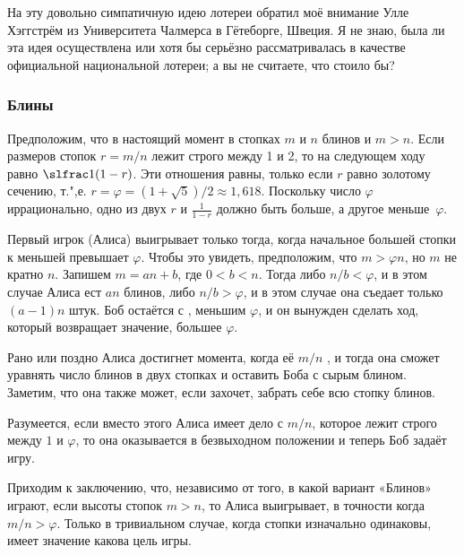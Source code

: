 \documentclass[twoside]{book}
\begin{document}
На эту довольно симпатичную идею лотереи обратил моё внимание Улле Хэггстрём из Университета Чалмерса в Гётеборге, Швеция. %
Я не знаю, была ли эта идея осуществлена или хотя бы серьёзно рассматривалась в качестве официальной национальной лотереи; а вы не считаете, что стоило бы?

\subsubsection*{Блины}%

Предположим, что в настоящий момент в стопках $m$ и $n$ блинов и $m > n$.
Если  размеров стопок $r = m/n$ лежит строго между 1 и 2, то на следующем ходу  равно $\slfrac1{(1-r)}$.
Эти отношения равны, только если $r$ равно золотому сечению,
т.",е. $r=\varphi=(1+\sqrt{5})/2\approx 1{,}618$.
Поскольку число $\varphi$ иррационально, одно из двух  $r$ и $\tfrac1{1-r}$ должно быть больше, а другое меньше~$\varphi$.

Первый игрок (Алиса) выигрывает только тогда, когда начальное  большей стопки к меньшей превышает $\varphi$.
Чтобы это увидеть, предположим, что $m>\varphi n$, но $m$ не кратно $n$.
Запишем $m=an+b$, где $0<b<n$.
Тогда либо $n/b<\varphi$, и в этом случае Алиса ест $an$ блинов, либо $n/b>\varphi$, и в этом случае она съедает только $(a-1)n$ штук.
Боб остаётся с , меньшим $\varphi$, и он вынужден сделать ход, который возвращает  значение, большее $\varphi$.

Рано или поздно Алиса достигнет момента, когда её  $m/n$ , и тогда она сможет уравнять число блинов в двух стопках и оставить Боба с сырым блином.
Заметим, что она также может, если захочет, забрать себе всю стопку блинов.

Разумеется, если вместо этого Алиса имеет дело с  $m/n$, которое лежит строго между $1$ и $\varphi$, то она оказывается в безвыходном положении %
и теперь Боб задаёт игру.

Приходим к заключению, что, независимо от того, в какой вариант «Блинов» играют, если высоты стопок $m>n$, то Алиса выигрывает, в точности когда $m/n>\varphi$.
Только в тривиальном случае, когда стопки изначально одинаковы, имеет значение какова цель игры.\heart
\end{document}
